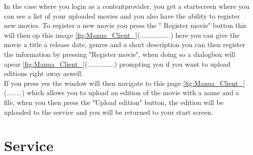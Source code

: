 In the case where you login as a contentprovider, you get a startscreen where you can see a list of your uploaded movies and you also have the ability to register new movies. To register a new movie you press the " Register movie" button this will then op this image \ref{fig:Manua_Client_}(................) here you can give the movie a title a release date, genres and a short description you can then register the information by pressing "Register movie", when doing so a dialogbox will apear \ref{fig:Manua_Client_}(..............) prompting you if you want to upload editions right away aswell.
\\If you press yes the window will then navigate to this page \ref{fig:Manua_Client_}(........) which allows you to upload an edition of the movie with a name and a file, when you then press the "Upload edition" button, the edition will be uploaded to the service and you will be returned to your start screen.

\section{Service}
\label{Manual_Service}